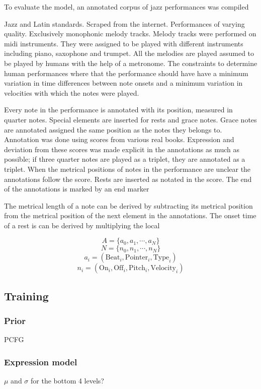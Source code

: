 To evaluate the model, an annotated corpus of jazz performances was compiled

Jazz and Latin standards. Scraped from the internet. Performances of varying quality. Exclusively monophonic melody tracks. Melody tracks were performed on midi instruments. They were assigned to be played with different instruments including piano, saxophone and trumpet. All the melodies are played assumed to be played by humans with the help of a metronome. The constraints to determine human performances where that the performance should have have a minimum variation in time differences between note onsets and a minimum variation in velocities with which the notes were played.

Every note in the performance is annotated with its position, measured in quarter notes. Special elements are inserted for rests and grace notes. Grace notes are annotated assigned the same position as the notes they belongs to. Annotation was done using scores from various real books. Expression and deviation from these scores was made explicit in the annotations as much as possible; if three quarter notes are played as a triplet, they are annotated as a triplet. When the metrical positions of notes in the performance are unclear the annotations follow the score. Rests are inserted as notated in the score. The end of the annotations is marked by an end marker

The metrical length of a note can be derived by subtracting its metrical position from the metrical position of the next element in the annotations. The onset time of a rest is can be derived by multiplying the local 

\[A = \{a_0, a_1, \cdots, a_N\}\]
\[N = \{n_0, n_1, \cdots, n_N\}\]
\[a_i = (\mathrm{Beat}_i, \mathrm{Pointer}_i, \mathrm{Type}_i)\]
\[n_i = (\mathrm{On}_i, \mathrm{Off}_i, \mathrm{Pitch}_i, \mathrm{Velocity}_i)\]

\subsection{Training}

\subsubsection{Prior}

PCFG

\subsubsection{Expression model}

$\mu$ and $\sigma$ for the bottom 4 levels?